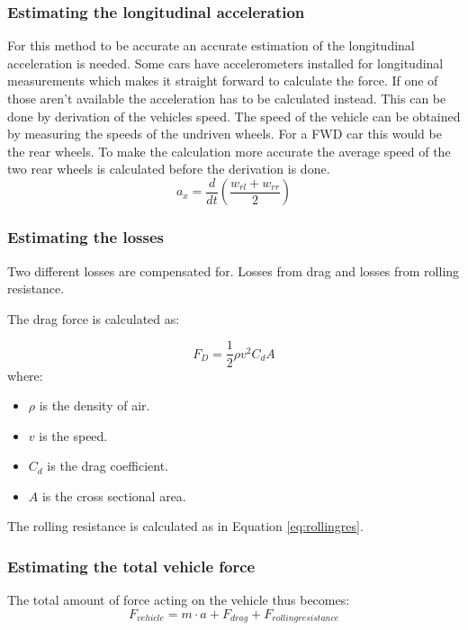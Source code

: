 \subsubsection{Estimating the longitudinal acceleration}
\label{longaccest}
For this method to be accurate an accurate estimation of the longitudinal acceleration is needed. Some cars have accelerometers installed for longitudinal measurements which makes it straight forward to calculate the force. If one of those aren't available the acceleration has to be calculated instead. This can be done by derivation of the vehicles speed. The speed of the vehicle can be obtained by measuring the speeds of the undriven wheels. For a FWD car this would be the rear wheels. To make the calculation more accurate the average speed of the two rear wheels is calculated before the derivation is done.
\begin{equation}
a_{x} = \frac{d}{dt}(\frac{w_{rl}+w_{rr}}{2})
\end{equation}

\subsubsection{Estimating the losses}
Two different losses are compensated for. Losses from drag and losses from rolling resistance.

The drag force is calculated as:

\begin{equation}
F_{D}=\frac{1}{2}\rho v^2 C_{d}A
\end{equation}
where:
\begin{itemize}
	\item $ \rho $ is the density of air.
	\item $ v $ is the speed.
	\item $ C_{d} $ is the drag coefficient.
	\item $ A $ is the cross sectional area.
\end{itemize}
The rolling resistance is calculated as in Equation \ref{eq:rollingres}.

\subsubsection{Estimating the total vehicle force}
The total amount of force acting on the vehicle thus becomes:
\begin{equation}
\label{eq:newton}
F_{vehicle} = m \cdot a + F_{drag} + F_{rolling resistance}
\end{equation}


